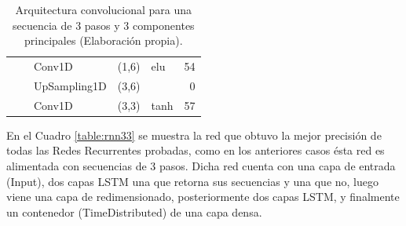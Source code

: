 \begin{table}[H]
\begin{center}
\begin{tabular}{ll|l|r|l|r|}
\multicolumn{1}{|l|}{}                              &                             & Conv1D                             & (1,6)                                & elu                                     & 54                                          \\ \cline{3-6} 
\multicolumn{1}{|l|}{}                              &                             & UpSampling1D                       & (3,6)                                &                                          & 0                                           \\ \cline{3-6} 
\multicolumn{1}{|l|}{}                              &                             & Conv1D                             & \multicolumn{1}{l|}{(3,3)}           & tanh                                     & 57                                          \\ \hline
\end{tabular}
\end{center}
\caption{Arquitectura convolucional para una secuencia de 3 pasos y 3 componentes principales (Elaboraci\'{o}n propia).}
\label{table:cnn33}
\end{table}


En el Cuadro \ref{table:rnn33} se muestra la red que obtuvo la mejor precisi\'{o}n de todas las Redes Recurrentes probadas, como en los anteriores casos \'{e}sta red es alimentada con secuencias de 3 pasos. Dicha red cuenta con una capa de entrada (Input), dos capas LSTM una que retorna sus secuencias y una que no, luego viene una capa de redimensionado, posteriormente dos capas LSTM, y finalmente un contenedor  (TimeDistributed) de una capa densa.

